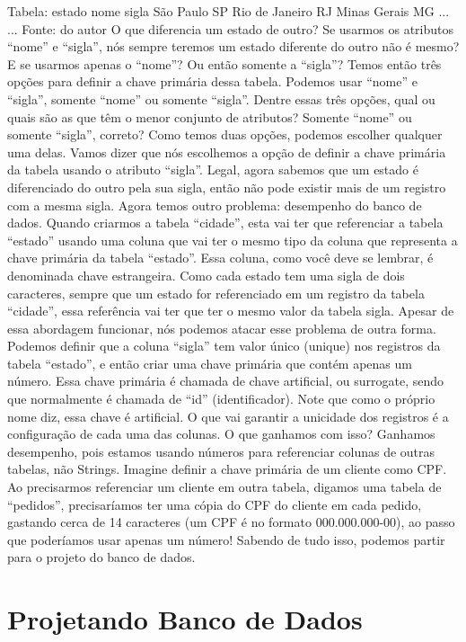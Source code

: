 Tabela: estado
nome	sigla
São Paulo	SP
Rio de Janeiro	RJ
Minas Gerais	MG
...	...
Fonte: do autor
O que diferencia um estado de outro? Se usarmos os atributos “nome” e “sigla”, nós sempre teremos um estado diferente do outro não é mesmo? E se usarmos apenas o “nome”? Ou então somente a “sigla”? Temos então três opções para definir a chave primária dessa tabela. Podemos usar “nome” e “sigla”, somente “nome” ou somente “sigla”. Dentre essas três opções, qual ou quais são as que têm o menor conjunto de atributos? Somente “nome” ou somente “sigla”, correto? Como temos duas opções, podemos escolher qualquer uma delas. Vamos dizer que nós escolhemos a opção de definir a chave primária da tabela usando o atributo “sigla”. Legal, agora sabemos que um estado é diferenciado do outro pela sua sigla, então não pode existir mais de um registro com a mesma sigla. 
Agora temos outro problema: desempenho do banco de dados. Quando criarmos a tabela “cidade”, esta vai ter que referenciar a tabela “estado” usando uma coluna que vai ter o mesmo tipo da coluna que representa a chave primária da tabela “estado”. Essa coluna, como você deve se lembrar, é denominada chave estrangeira. Como cada estado tem uma sigla de dois caracteres, sempre que um estado for referenciado em um registro da tabela “cidade”, essa referência vai ter que ter o mesmo valor da tabela sigla. Apesar de essa abordagem funcionar, nós podemos atacar esse problema de outra forma. Podemos definir que a coluna “sigla” tem valor único (unique) nos registros da tabela “estado”, e então criar uma chave primária que contém apenas um número. Essa chave primária é chamada de chave artificial, ou surrogate, sendo que normalmente é chamada de “id” (identificador). Note que como o próprio nome diz, essa chave é artificial. O que vai garantir a unicidade dos registros é a configuração de cada uma das colunas. 
O que ganhamos com isso? Ganhamos desempenho, pois estamos usando números para referenciar colunas de outras tabelas, não Strings. Imagine definir a chave primária de um cliente como CPF. Ao precisarmos referenciar um cliente em outra tabela, digamos uma tabela de “pedidos”, precisaríamos ter uma cópia do CPF do cliente em cada pedido, gastando cerca de 14 caracteres (um CPF é no formato 000.000.000-00), ao passo que poderíamos usar apenas um número! Sabendo de tudo isso, podemos partir para o projeto do banco de dados.


\section{Projetando Banco de Dados}

